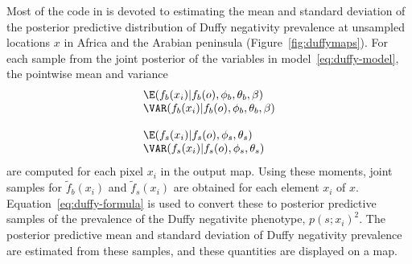 \documentclass[article]{jss}
\begin{document}
\bigskip
Most of the code in  is devoted to estimating the mean and standard deviation of the posterior predictive distribution of Duffy negativity prevalence at unsampled locations $x$ in Africa and the Arabian peninsula (Figure~\ref{fig:duffymaps}). For each sample from the joint posterior of the variables in model~\ref{eq:duffy-model}, 
the pointwise mean and variance 
\begin{equation}
    \label{eq:map-moments} 
    \begin{array}{l}
        \E(f_b(x_i)|f_b(o), \phi_b, \theta_b, \beta)\\
        \VAR(f_b(x_i)|f_b(o), \phi_b, \theta_b, \beta)\\\\
        \E(f_s(x_i)|f_s(o), \phi_s, \theta_s)\\
        \VAR(f_s(x_i)|f_s(o), \phi_s, \theta_s)
    \end{array}
\end{equation}
are computed for each pixel $x_i$ in the output map. Using these moments, joint samples for $\tilde f_b(x_i)$ and $\tilde f_s(x_i)$ are obtained for each element $x_i$ of $x$. Equation~\ref{eq:duffy-formula} is used to convert these to posterior predictive samples of the prevalence of the Duffy negativite phenotype, $p(s;x_i)^2$. The posterior predictive mean and standard deviation of Duffy negativity prevalence are estimated from these samples, and these quantities are displayed on a map.
\end{document}
